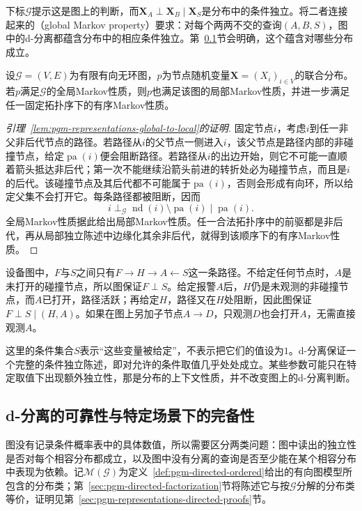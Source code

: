 下标$\mathcal{G}$提示这是图上的判断，而$\bm{X}_A\perp\bm{X}_B\mid\bm{X}_S$是分布中的条件独立。将二者连接起来的（global Markov property）要求：对每个两两不交的查询$(A,B,S)$，图中的d-分离都蕴含分布中的相应条件独立。第~\ref{sec:pgm-directed-sound-complete}节会明确，这个蕴含对哪些分布成立。

\begin{lemma}[全局Markov性质蕴含局部Markov性质]
  \label{lem:pgm-representations-global-to-local}
  设$\mathcal{G}=(V,E)$为有限有向无环图，$p$为节点随机变量$\bm{X}=(X_i)_{i\in V}$的联合分布。若$p$满足$\mathcal{G}$的全局Markov性质，则$p$也满足该图的局部Markov性质，并进一步满足任一固定拓扑序下的有序Markov性质。
\end{lemma}

\begin{proof}[引理~\ref{lem:pgm-representations-global-to-local}的证明]
固定节点$i$，考虑$i$到任一非父非后代节点的路径。若路径从$i$的父节点一侧进入$i$，该父节点是路径内部的非碰撞节点，给定$\operatorname{pa}(i)$便会阻断路径。若路径从$i$的出边开始，则它不可能一直顺着箭头抵达非后代；第一次不能继续沿箭头前进的转折处必为碰撞节点，而且是$i$的后代。该碰撞节点及其后代都不可能属于$\operatorname{pa}(i)$，否则会形成有向环，所以给定父集不会打开它。每条路径都被阻断，因而
\[
  i\perp_{\mathcal G}
  \operatorname{nd}(i)\setminus\operatorname{pa}(i)
  \mid\operatorname{pa}(i).
\]
全局Markov性质据此给出局部Markov性质。任一合法拓扑序中的前驱都是非后代，再从局部独立陈述中边缘化其余非后代，就得到该顺序下的有序Markov性质。
\end{proof}

设备图中，$F$与$S$之间只有$F\to H\to A\leftarrow S$这一条路径。不给定任何节点时，$A$是未打开的碰撞节点，所以图保证$F\perp S$。给定报警$A$后，$H$仍是未观测的非碰撞节点，而$A$已打开，路径活跃；再给定$H$，路径又在$H$处阻断，因此图保证$F\perp S\mid(H,A)$。如果在图上另加子节点$A\to D$，只观测$D$也会打开$A$，无需直接观测$A$。

这里的条件集合$S$表示“这些变量被给定”，不表示把它们的值设为$1$。d-分离保证一个完整的条件独立陈述，即对允许的条件取值几乎处处成立。某些参数可能只在特定取值下出现额外独立性，那是分布的上下文性质，并不改变图上的d-分离判断。

\subsection{d-分离的可靠性与特定场景下的完备性}
\label{sec:pgm-directed-sound-complete}

图没有记录条件概率表中的具体数值，所以需要区分两类问题：图中读出的独立性是否对每个相容分布都成立，以及图中没有分离的查询是否至少能在某个相容分布中表现为依赖。记$\mathcal{M}(\mathcal{G})$为定义~\ref{def:pgm-directed-ordered}给出的有向图模型所包含的分布类；第~\ref{sec:pgm-directed-factorization}节将陈述它与按$\mathcal{G}$分解的分布类等价，证明见第~\ref{sec:pgm-representations-directed-proofs}节。

